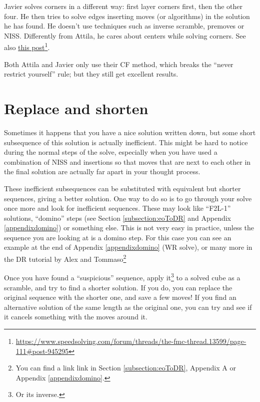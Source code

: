 \documentclass[11pt,a4paper]{book}
\begin{document}
Javier solves corners in a different way: first layer corners first, then the other four. He then tries to solve edges inserting moves (or algorithms) in the solution he has found. He doesn't use techniques such as inverse scramble, premoves or NISS. Differently from Attila, he cares about centers while solving corners. See also \href{https://www.speedsolving.com/forum/threads/the-fmc-thread.13599/page-111\#post-945295}{this post}\footnote{\url{https://www.speedsolving.com/forum/threads/the-fmc-thread.13599/page-111\#post-945295}}.

Both Attila and Javier only use their CF method, which breaks the ``never restrict yourself'' rule; but they still get excellent results.

\section{Replace and shorten}
\label{sec:replace}

Sometimes it happens that you have a nice solution written down, but some short subsequence of this solution is actually inefficient. This might be hard to notice during the normal steps of the solve, especially when you have used a combination of NISS and insertions so that moves that are next to each other in the final solution are actually far apart in your thought process.

These inefficient subsequences can be substituted with equivalent but shorter sequences, giving a better solution. One way to do so is to go through your solve once more and look for inefficient sequences. These may look like ``F2L-1'' solutions, ``domino'' steps (see Section \ref{subsection:eoToDR} and Appendix \ref{appendixdomino}) or something else. This is not very easy in practice, unless the sequence you are looking at is a domino step. For this case you can see an example at the end of Appendix \ref{appendixdomino} (WR solve), or many more in the DR tutorial by Alex and Tommaso\footnote{You can find a link link in Section \ref{subsection:eoToDR}, Appendix A or Appendix \ref{appendixdomino}.}

Once you have found a ``suspicious'' sequence, apply it\footnote{Or its inverse.} to a solved cube as a scramble, and try to find a shorter solution. If you do, you can replace the original sequence with the shorter one, and save a few moves! If you find an alternative solution of the same length as the original one, you can try and see if it cancels something with the moves around it.
\end{document}
